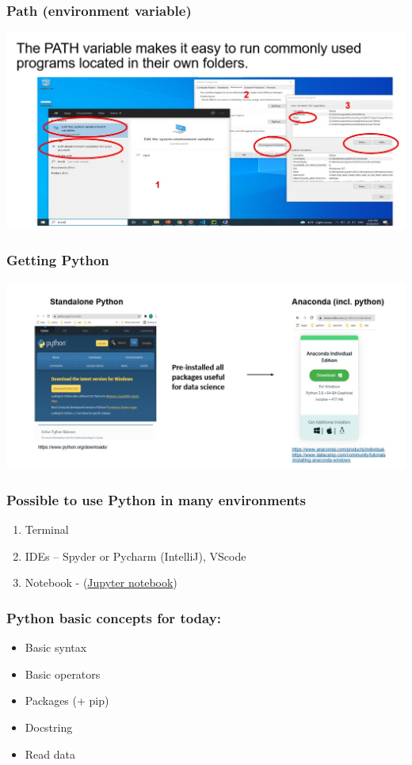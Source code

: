 \documentclass{beamer}
\begin{document}
\begin{frame}
    \frametitle{Path (environment variable)}
    \centering
    \includegraphics[scale = 0.5]{figures/path.jpg}
\end{frame}

\begin{frame}
    \frametitle{Getting Python}
    \centering
    \includegraphics[scale = 0.5]{figures/getpython.jpg}
\end{frame}

\begin{frame}
    \frametitle{Possible to use Python in many environments}

    \begin{enumerate}
        \item Terminal
        \item IDEs – Spyder or Pycharm (IntelliJ), VScode
        \item Notebook -  (\href{https://github.com/susanli2016/Machine-Learning-with-Python}
        {Jupyter notebook})
    \end{enumerate}
\end{frame}

\begin{frame}
    \frametitle{Python basic concepts for today:}

    \begin{itemize}
        \item Basic syntax
        \item Basic operators
        \item Packages (+ pip)
        \item Docstring
        \item Read data
    \end{itemize}
\end{frame}
\end{document}
